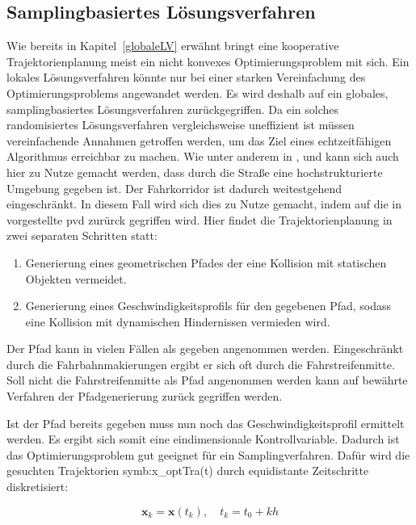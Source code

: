 \subsection{Samplingbasiertes L\"osungsverfahren}
\label{sec:SmapPVD}
Wie bereits in Kapitel~\ref{globaleLV} erw\"ahnt bringt eine kooperative Trajektorienplanung meist ein nicht konvexes Optimierungsproblem mit sich.
Ein lokales L\"osungsverfahren k\"onnte nur bei einer starken Vereinfachung des Optimierungsproblems angewandet werden.
Es wird deshalb auf ein globales, samplingbasiertes L\"osungsverfahren zur\"uckgegriffen.
Da ein solches randomisiertes L\"osungsverfahren vergleichsweise uneffizient ist m\"ussen vereinfachende Annahmen getroffen werden, um das Ziel eines echtzeitf\"ahigen Algorithmus erreichbar zu machen.
Wie unter anderem in \cite{Ziegler2017}, \cite{Werling2011} und \cite{Rathgeber2016} kann sich auch hier zu Nutze gemacht werden, dass durch die Stra{\ss}e eine hochstrukturierte Umgebung gegeben ist.
Der Fahrkorridor ist dadurch weitestgehend eingeschr\"ankt.
In diesem Fall wird sich dies zu Nutze gemacht, indem auf die in \cite{Kant1986} vorgestellte \gls{pvd} zur\"urck gegriffen wird.
Hier findet die Trajektorienplanung in zwei separaten Schritten statt:

\begin{enumerate}
\item Generierung eines geometrischen Pfades der eine Kollision mit statischen Objekten vermeidet.
\item Generierung eines Geschwindigkeitsprofils f\"ur den gegebenen Pfad, sodass eine Kollision mit dynamischen Hindernissen vermieden wird.
\end{enumerate}

Der Pfad kann in vielen F\"allen als gegeben angenommen werden.
Eingeschr\"ankt durch die Fahrbahnmakierungen ergibt er sich oft durch die Fahrstreifenmitte. 
Soll nicht die Fahrstreifenmitte als Pfad angenommen werden kann auf bew\"ahrte Verfahren der Pfadgenerierung zur\"uck gegriffen werden.

Ist der Pfad bereits gegeben muss nun noch das Geschwindigkeitsprofil ermittelt werden.
Es ergibt sich somit eine eindimensionale Kontrollvariable.
Dadurch ist das Optimierungsproblem gut geeignet f\"ur ein Samplingverfahren.
Daf\"ur wird die gesuchten Trajektorien \gls{symb:x_optTra}(t) durch equidistante Zeitschritte diskretisiert:

\begin{equation}
\pmb{x}_k=\pmb{x}(t_k),   \quad t_k =t_0+k h
\end{equation}

